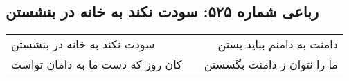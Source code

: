 \begin{center}
\section*{رباعی شماره ۵۲۵: سودت نکند به خانه در بنشستن}
\label{sec:sh525}
\begin{longtable}{l p{0.5cm} r}
سودت نکند به خانه در بنشستن
&&
دامنت به دامنم بباید بستن
\\
کان روز که دست ما به دامان تواست
&&
ما را نتوان ز دامنت بگسستن
\\
\end{longtable}
\end{center}
